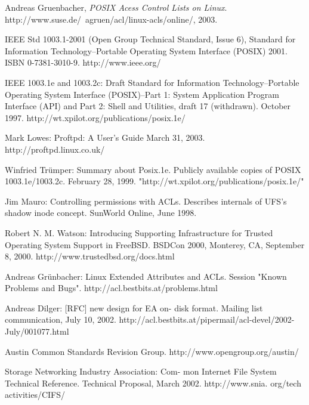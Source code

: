 \documentclass{article}
\begin{document}
\begin{thebibliography}{9}
 
  Andreas Gruenbacher,
  \emph{POSIX Acess Control Lists on Linux}.
  http://www.suse.de/~agruen/acl/linux-acls/online/,
  2003.

    IEEE Std 1003.1-2001 (Open Group Technical Standard, Issue 6), 
	Standard for Information Technology--Portable Operating System Interface (POSIX) 2001. 
	ISBN 0-7381-3010-9. 
	http://www.ieee.org/

    IEEE 1003.1e and 1003.2c: Draft Standard for Information Technology--Portable Operating System Interface (POSIX)--Part 1: System Application Program Interface (API) and Part 2: Shell and Utilities, draft 17 (withdrawn). 
	October 1997. 
	http://wt.xpilot.org/publications/posix.1e/

	Mark Lowes: 
	Proftpd: 
	A User's Guide March 31, 2003. 
	http://proftpd.linux.co.uk/

    Winfried Trümper: Summary about Posix.1e. Publicly available copies of POSIX 1003.1e/1003.2c. February 28, 1999. "http://wt.xpilot.org/publications/posix.1e/"

	Jim Mauro: Controlling permissions with ACLs. Describes internals of UFS's shadow inode concept. SunWorld Online, June 1998.

	Robert N. M. Watson: Introducing Supporting Infrastructure for Trusted Operating System Support in FreeBSD. BSDCon 2000, Monterey, CA, September 8, 2000. http://www.trustedbsd.org/docs.html
	
	Andreas Grünbacher: Linux Extended Attributes and ACLs. Session "Known Problems and Bugs". http://acl.bestbits.at/problems.html
	
	Andreas Dilger: [RFC] new design for EA on- disk format. Mailing list communication, July 10, 2002. http://acl.bestbits.at/pipermail/acl-devel/2002-July/001077.html
	
	Austin Common Standards Revision Group. http://www.opengroup.org/austin/

	Storage Networking Industry Association: Com- mon Internet File System Technical Reference. Technical Proposal, March 2002. http://www.snia. org/tech activities/CIFS/

\end{thebibliography}
\end{document}
